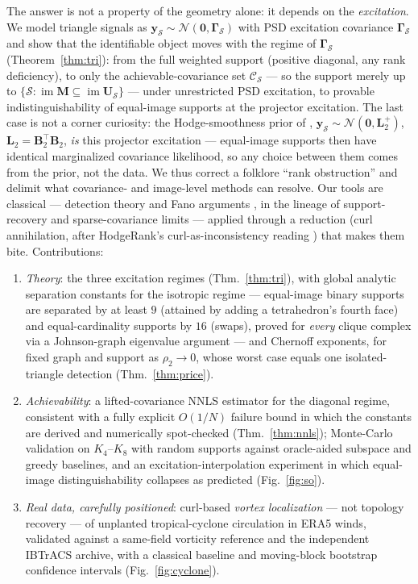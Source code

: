 \documentclass{article}
\DeclareMathOperator{\im}{im}
\newcommand{\B}{\bm{B}}
\newcommand{\Scal}{\mathcal{S}}
\newcommand{\Ccal}{\mathcal{C}}
\newcommand{\Gam}{\bm{\Gamma}}
\begin{document}
The answer is not a property of the geometry alone: it depends on the
\emph{excitation}. We model triangle signals as
$\bm y_\Scal\sim\mathcal N(\bm 0,\Gam_\Scal)$ with PSD excitation covariance
$\Gam_\Scal$ and show that the identifiable object moves with the regime of
$\Gam_\Scal$ (Theorem~\ref{thm:tri}): from the full weighted support
(positive diagonal, any rank deficiency), to only the achievable-covariance
set $\Ccal_\Scal$ --- so the support merely up to
$\{\Scal:\im\bm M\subseteq\im\bm U_\Scal\}$ --- under unrestricted PSD
excitation, to provable
indistinguishability of equal-image supports at the projector excitation. The
last case is not a corner curiosity: the Hodge-smoothness prior of
\cite{gurugubelli2024simplicial}, $\bm y_\Scal\sim\mathcal N(\bm 0,\bm L_2^{+})$,
$\bm L_2=\B_2^{\!\top}\B_2$, \emph{is} this projector excitation --- equal-image
supports then have identical marginalized covariance likelihood, so any choice
between them comes from the prior, not the data. We thus correct a folklore
``rank obstruction'' and delimit what covariance- and image-level methods
\cite{barbarossa2020topological,marinucci2025simplicial,liu2025matched} can
resolve. Our tools are
classical --- detection theory and Fano arguments
\cite{poor1994introduction,cover2006elements}, in the lineage of
support-recovery and sparse-covariance limits
\cite{wainwright2009information,amini2009high,berthet2013optimal,cai2010optimal}
--- applied through a reduction (curl annihilation, after HodgeRank's
curl-as-inconsistency reading \cite{jiang2011statistical}) that makes them
bite. Contributions:
\begin{enumerate}\itemsep2pt\parskip0pt
\item \emph{Theory}: the three excitation regimes (Thm.~\ref{thm:tri}), with
global analytic separation constants for the isotropic regime --- equal-image
binary supports are separated by at least $9$ (attained by adding a
tetrahedron's fourth face) and equal-cardinality supports by $16$ (swaps),
proved for \emph{every} clique complex via a Johnson-graph eigenvalue
argument --- and Chernoff exponents, for fixed graph and support as
$\rho_2\to0$, whose worst case equals one isolated-triangle detection
(Thm.~\ref{thm:price}).
\item \emph{Achievability}: a lifted-covariance NNLS estimator for the
diagonal regime, consistent with a fully explicit $O(1/N)$ failure bound
in which the constants are derived and numerically spot-checked
(Thm.~\ref{thm:nnls}); Monte-Carlo validation on $K_4$--$K_8$ with random
supports against oracle-aided subspace and greedy baselines, and an
excitation-interpolation experiment in which equal-image distinguishability
collapses as predicted (Fig.~\ref{fig:so}).
\item \emph{Real data, carefully positioned}: curl-based \emph{vortex
localization} --- not topology recovery --- of unplanted tropical-cyclone
circulation in ERA5 winds, validated against a same-field vorticity
reference and the independent IBTrACS archive, with a classical baseline and
moving-block bootstrap confidence intervals (Fig.~\ref{fig:cyclone}).
\end{enumerate}
\end{document}
